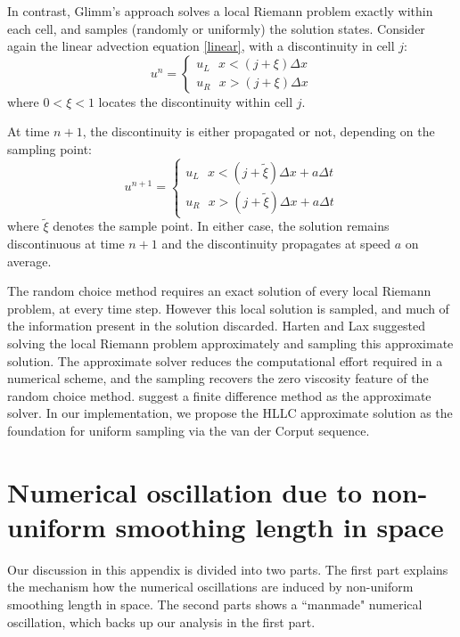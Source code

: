 \documentclass[preprint,12pt,authoryear]{elsarticle}
\begin{document}
In contrast, Glimm\rq{}s approach solves a local Riemann problem exactly within each cell,
and samples (randomly or uniformly) the solution states. Consider again the linear advection equation \ref{linear}, with a discontinuity in cell $j$:
\begin{equation}
u^n = \begin{cases}
	u_L ~~~ x< (j+\xi)\Delta x \\
 	u_R ~~~ x> (j+\xi)\Delta x
	\end{cases}			
\end{equation}
where $0<\xi<1$ locates the discontinuity within cell $j$.

At time $n+1$, the discontinuity is either propagated or not, depending on the sampling
point:
\begin{equation}
u^{n+1} = \begin{cases}
		  u_L ~~~ x< (j+\tilde \xi)\Delta x + a \Delta t \\
		  u_R ~~~ x> (j+\tilde \xi)\Delta x + a \Delta t
	        \end{cases}
\end{equation}
where $\tilde \xi$ denotes the sample point.
In either case, the solution remains discontinuous at time $n+1$ and the 
discontinuity propagates at speed $a$ on average.

The random choice method requires an exact solution of every local Riemann problem, at every time step.
However this local solution is sampled, and much of the information present in the solution discarded.
Harten and Lax \citet{harten1981random} suggested solving the local Riemann problem approximately 
and sampling this approximate solution. The approximate solver reduces the computational
effort required in a numerical scheme, and the sampling recovers the zero viscosity
feature of the random choice method. \citet{hartenlax} suggest a finite difference
method as the approximate solver.
In our implementation, we propose the HLLC approximate solution as the foundation for
uniform sampling via the van der Corput sequence.
\citep{glimm1965solutions}
\citep{colella1982glimm}
\citep{chorin1976random}
\citep{concus1979numerical}
\citep{warming1974modified}
\citep{liu1977deterministic}

\section{Numerical oscillation due to non-uniform smoothing length in space}
Our discussion in this appendix is divided into two parts. The first part explains the mechanism how the numerical oscillations are induced by non-uniform smoothing length in space. The second parts  shows a ``manmade" numerical oscillation, which backs up our analysis in the first part.
\end{document}
